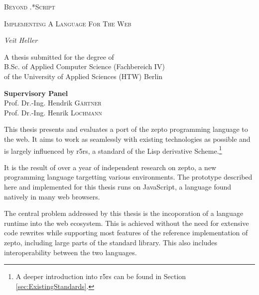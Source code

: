 \documentclass[oneside,11pt,xetex]{scrbook}
\begin{document}
\begin{titlepage}
	\centering
	{\scshape\LARGE Beyond .*Script \par}
	\vspace{1cm}
	{\scshape\Large Implementing A Language For The Web\par}
	\vspace{2cm}
	{\Large\itshape Veit Heller\par}
	\vfill
  A thesis submitted for the degree of \\
  B.Sc. of Applied Computer Science (Fachbereich IV) \\
  of the University of Applied Sciences (HTW) Berlin
	\vfill

  \textbf{Supervisory Panel}\\

  Prof. Dr.-Ing. Hendrik \textsc{Gärtner}\\

  Prof. Dr.-Ing. Henrik \textsc{Lochmann}\\
	\vfill

\end{titlepage}

\dedication{\small{\emph{For Meredith, Tobias and all the people who cope with me. Your undying support will not be forgotten.}}}


\frontmatter


This thesis presents and evaluates a port of the zepto programming language to the web. It aims to
work as seamlessly with existing technologies as possible and is largely influenced by \gls{r5rs},
a standard of the Lisp derivative Scheme.\footnote{A deeper introduction into \gls{r5rs} can be found
in Section \ref{sec:ExistingStandards}.}

It is the result of over a year of independent research on zepto, a new programming language
targetting various environments. The prototype described here and implemented for this
thesis runs on JavaScript, a language found natively in many web browsers.

The central problem addressed by this thesis is the incoporation of a language runtime
into the web ecosystem. This is achieved without the need for extensive code rewrites
while supporting most features of the reference implementation of zepto, including large
parts of the standard library. This also includes interoperability between the two languages.
\end{document}
